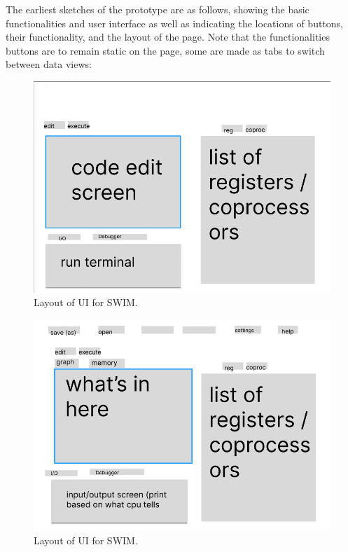 \documentclass[
    paper=letter,
    parskip=half,
    fontsize=12pt,
    titlepage=firstiscover,
    toc=bibliography,
    numbers=endperiod
]{scrartcl}
\begin{document}
The earliest sketches of the prototype are as follows, showing the basic
functionalities and user interface as well as indicating the locations
of buttons, their functionality, and the layout of the page. Note that
the functionalities buttons are to remain static on the page, some are
made as tabs to switch between data views:

\begin{figure}[H]
    \includegraphics[width=\textwidth]{ui-prototype-1}
    \caption{Layout of UI for SWIM.}
\end{figure}

\begin{figure}[H]
    \includegraphics[width=\textwidth]{ui-prototype-2}
    \caption{Layout of UI for SWIM.}
\end{figure}
\end{document}
